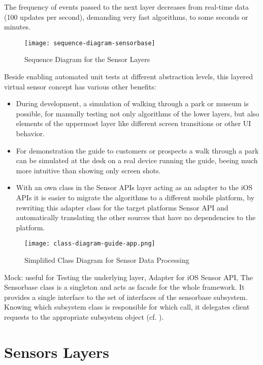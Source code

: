 The frequency of events passed to the next layer decreases from real-time data (100 updates per second), demanding very fast algorithms, to some seconds or minutes.

\begin{figure}[H]
\centering
\texttt{[image: sequence-diagram-sensorbase]}
\caption{Sequence Diagram for the Sensor Layers}
\end{figure}

Beside enabling automated unit tests at different abstraction levels, this layered virtual sensor concept has various other benefits:

\begin{itemize}
\item During development, a simulation of walking through a park or museum is possible, for manually testing not only algorithms of the lower layers, but also elements of the uppermost layer like different screen transitions or other UI behavior.
\item For demonstration the guide to customers or prospects a walk through a park can be simulated at the desk on a real device running the guide, beeing much more intuitive than showing only screen shots.
\item With an own class in the Sensor APIs layer acting as an adapter to the iOS APIs it is easier to migrate the algorithms to a different mobile platform, by rewriting this adapter class for the target platforms Sensor API and automatically translating the other sources that have no dependencies to the platform.
\end{itemize}


\begin{figure}[H]
\centering
\texttt{[image: class-diagram-guide-app.png]}
\caption{Simplified Class Diagram for Sensor Data Processing}
\end{figure}

Mock: useful for Testing the underlying layer,
Adapter for iOS Sensor API,
The Sensorbase class is a singleton and acts as facade for the whole framework. It provides a single interface to the set of interfaces of the sensorbase subsystem. Knowing which subsystem class is responsible for which call, it delegates client requests to the appropriate subsystem object (cf. \cite{gof}).


\section{Sensors Layers}

